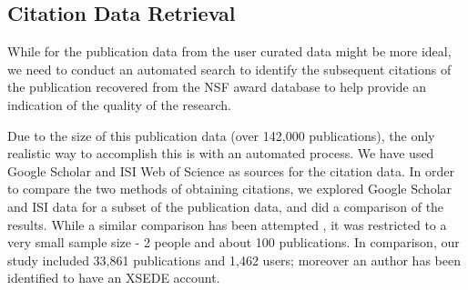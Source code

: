 \documentclass{sig-alternate}
\begin{document}
\subsection{Citation Data Retrieval} 
 
While for the publication data from the user curated data might be more ideal, we need to conduct an automated search to identify the subsequent citations of the publication recovered from the NSF award database to help provide an indication of the quality of the research.

Due to the size of this publication data (over 142,000 publications), the only realistic way to accomplish this is with an automated process. We have used Google Scholar and ISI Web of Science as sources for the citation data. In order to compare the two methods of obtaining citations, we explored Google Scholar and ISI data for a subset of the publication data, and did a comparison of the results. While a similar comparison has been attempted \cite{yang2006citation}, it was restricted to a very small sample size - 2 people and about 100 publications. In comparison, our study included 33,861 publications and 1,462 users; moreover an author has been identified to have an XSEDE account.
\end{document}
